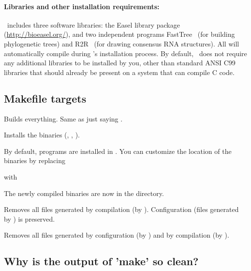 \paragraph{Libraries and other installation requirements:} \rscape\ includes
three software libraries: the Easel library package
(\url{http://bioeasel.org/}), and two independent programs
FastTree~\citep{Price10} (for building phylogenetic trees) and
R2R~\citep{WeinbergBreaker11} (for drawing consensus RNA
structures). All will automatically compile during \rscape's
installation process.  By default, \rscape\ does not require any
additional libraries to be installed by you, other than standard ANSI
C99 libraries that should already be present on a system that can
compile C code.

\subsection{Makefile targets}

\begin{sreitems}{}

\item[\emprog{all}]
  Builds everything. Same as just saying .

\item[\emprog{install}] 
  Installs the binaries (, , ).

  By default, programs are installed in
  . 
  You can customize the location of the binaries by replacing
  
  
  with
  
  
  The newly compiled binaries are now in the
   directory.\\
  
\item[\emprog{clean}]
  Removes all files generated by compilation (by
  ). Configuration (files generated by
  ) is preserved.

\item[\emprog{distclean}]
  Removes all files generated by configuration (by )
  and by compilation (by ). 

\end{sreitems}

\subsection{Why is the output of 'make' so clean?}

